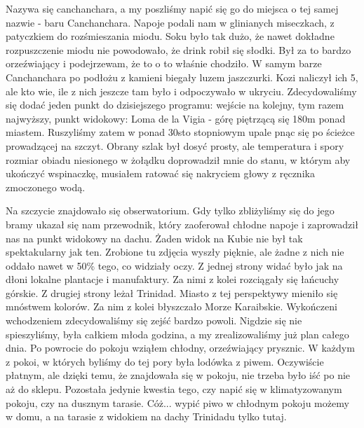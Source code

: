 Nazywa się canchanchara, a my poszliśmy napić się go do miejsca o tej samej nazwie - baru Canchanchara.
Napoje podali nam w glinianych miseczkach, z patyczkiem do rozśmieszania miodu.
Soku było tak dużo, że nawet dokładne rozpuszczenie miodu nie powodowało, że drink robił się słodki.
Był za to bardzo orzeźwiający i podejrzewam, że to o to właśnie chodziło.
W samym barze Canchanchara po podłożu z kamieni biegały luzem jaszczurki.
Kozi naliczył ich 5, ale kto wie, ile z nich jeszcze tam było i odpoczywało w ukryciu.
Zdecydowaliśmy się dodać jeden punkt do dzisiejszego programu: wejście na kolejny, tym razem najwyższy, punkt widokowy: Loma de la Vigia - górę piętrzącą się 180m ponad miastem.
Ruszyliśmy zatem w ponad 30sto stopniowym upale pnąc się po ścieżce prowadzącej na szczyt.
Obrany szlak był dosyć prosty, ale temperatura i spory rozmiar obiadu niesionego w żołądku doprowadził mnie do stanu, w którym aby ukończyć wspinaczkę, musiałem ratować się nakryciem głowy z ręcznika zmoczonego wodą.
\par Na szczycie znajdowało się obserwatorium.
Gdy tylko zbliżyliśmy się do jego bramy ukazał się nam przewodnik, który zaoferował chłodne napoje i zaprowadził nas na punkt widokowy na dachu.
Żaden widok na Kubie nie był tak spektakularny jak ten.
Zrobione tu zdjęcia wyszły pięknie, ale żadne z nich nie oddało nawet w 50\% tego, co widziały oczy.
Z jednej strony widać było jak na dłoni lokalne plantacje i manufaktury.
Za nimi z kolei rozciągały się łańcuchy górskie.
Z drugiej strony leżał Trinidad.
Miasto z tej perspektywy mieniło się mnóstwem kolorów.
Za nim z kolei błyszczało Morze Karaibskie.
Wykończeni wchodzeniem zdecydowaliśmy się zejść bardzo powoli.
Nigdzie się nie spieszyliśmy, była całkiem młoda godzina, a my zrealizowaliśmy już plan całego dnia.
Po powrocie do pokoju wziąłem chłodny, orzeźwiający prysznic.
W każdym z pokoi, w których byliśmy do tej pory była lodówka z piwem.
Oczywiście płatnym, ale dzięki temu, że znajdowała się w pokoju, nie trzeba było iść po nie aż do sklepu.
Pozostała jedynie kwestia tego, czy napić się w klimatyzowanym pokoju, czy na dusznym tarasie.
Cóż...
wypić piwo w chłodnym pokoju możemy w domu, a na tarasie z widokiem na dachy Trinidadu tylko tutaj.